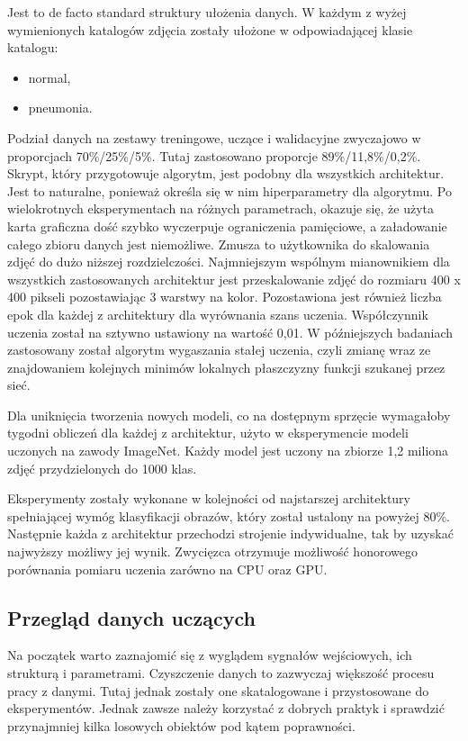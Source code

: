 \documentclass[12pt,a4paper,twoside,titlepage,openright]{book}
\begin{document}
Jest to de facto standard struktury ułożenia danych. W każdym z wyżej wymienionych katalogów zdjęcia zostały ułożone w odpowiadającej klasie katalogu:
\begin{itemize}
\item normal,
\item pneumonia.
\end{itemize}

Podział danych na zestawy treningowe, uczące i walidacyjne zwyczajowo w proporcjach 70\%/25\%/5\%. Tutaj zastosowano proporcje 89\%/11,8\%/0,2\%.
Skrypt, który przygotowuje algorytm, jest podobny dla wszystkich architektur. Jest to naturalne, ponieważ określa się w nim hiperparametry dla algorytmu. Po wielokrotnych eksperymentach na różnych parametrach, okazuje się, że użyta karta graficzna dość szybko wyczerpuje ograniczenia pamięciowe, a załadowanie całego zbioru danych jest niemożliwe. Zmusza to użytkownika do skalowania zdjęć do dużo niższej rozdzielczości. Najmniejszym wspólnym mianownikiem dla wszystkich zastosowanych architektur jest przeskalowanie zdjęć do rozmiaru 400 x 400 pikseli pozostawiając 3 warstwy na kolor. Pozostawiona jest również liczba epok dla każdej z architektury dla wyrównania szans uczenia. Współczynnik uczenia został na sztywno ustawiony na wartość 0,01. W późniejszych badaniach zastosowany został algorytm wygaszania stałej uczenia, czyli zmianę wraz ze znajdowaniem kolejnych minimów lokalnych płaszczyzny funkcji szukanej przez sieć.

Dla uniknięcia tworzenia nowych modeli, co na dostępnym sprzęcie wymagałoby tygodni obliczeń dla każdej z architektur, użyto w eksperymencie modeli uczonych na zawody ImageNet. Każdy model jest uczony na zbiorze 1,2 miliona zdjęć przydzielonych do 1000 klas.

Eksperymenty zostały wykonane w kolejności od najstarszej architektury spełniającej wymóg klasyfikacji obrazów, który został ustalony na powyżej 80\%. Następnie każda z architektur przechodzi strojenie indywidualne, tak by uzyskać najwyższy możliwy jej wynik. Zwycięzca otrzymuje możliwość honorowego porównania pomiaru uczenia zarówno na CPU oraz GPU.

\subsection{Przegląd danych uczących}
Na początek warto zaznajomić się z wyglądem sygnałów wejściowych, ich strukturą i parametrami. Czyszczenie danych to zazwyczaj większość procesu pracy z danymi. Tutaj jednak zostały one skatalogowane i przystosowane do eksperymentów. Jednak zawsze należy korzystać z dobrych praktyk i sprawdzić przynajmniej kilka losowych obiektów pod kątem poprawności.
\end{document}
